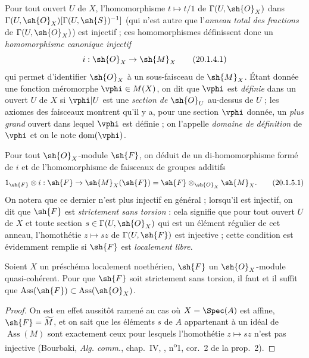 \begin{env}[20.1.4]
Pour tout ouvert $U$ de $X$, l'homomorphisme $t\mapsto t/1$ de $\Gamma(U,\sh{O}_X)$ dans $\Gamma(U,\sh{O}_X)[\Gamma(U,\sh{S})^{-1}]$ (qui n'est autre que l'\emph{anneau total des fractions} de
$\Gamma(U,\sh{O}_X)$) est injectif ; ces homomorphismes définissent donc un \emph{homomorphisme canonique injectif}
\[
\label{IV.20.1.4.1}
  i:\sh{O}_X\to\sh{M}_X
  \tag{20.1.4.1}
\]
qui permet d'identifier $\sh{O}_X$ à un sous-faisceau de $\sh{M}_X$.
Étant donnée une fonction méromorphe $\vphi\in M(X)$, on dit que $\vphi$ est \emph{définie} dans un ouvert $U$ de $X$ si $\vphi|U$ est une \emph{section de $\sh{O}_U$} au-dessus de $U$ ; les axiomes des faisceaux montrent qu'il y a, pour une section $\vphi$ donnée, un \emph{plus grand} ouvert dans lequel $\vphi$ est définie ; on l'appelle \emph{domaine de définition} de $\vphi$ et on le note $\operatorname{dom}(\vphi)$.
\end{env}

\begin{env}[20.1.5]
Pour tout $\sh{O}_X$-module $\sh{F}$, on déduit de  un di-homomorphisme formé de $i$ et de l'homomorphisme de faisceaux de groupes additifs
\[
\label{IV.20.1.5.1}
  1_{\sh{F}}\otimes i:\sh{F}\to\sh{M}_X(\sh{F})=\sh{F}\otimes_{\sh{O}_X}\sh{M}_X.
  \tag{20.1.5.1}
\]
On notera que ce dernier n'est plus injectif en général ; lorsqu'il est injectif, on dit que $\sh{F}$ est \emph{strictement sans torsion} : cela signifie que pour tout ouvert $U$ de $X$ et toute section $s\in\Gamma(U,\sh{O}_X)$ qui est un élément régulier de cet anneau, l'homothétie $z\mapsto sz$ de $\Gamma(U,\sh{F})$ est injective ; cette condition est évidemment remplie si $\sh{F}$ est \emph{localement libre}.
\end{env}

\begin{proposition}[20.1.6]
\label{IV.20.1.6}
Soient $X$ un préschéma localement noethérien, $\sh{F}$ un $\sh{O}_X$-module quasi-cohérent.
Pour que $\sh{F}$ soit strictement sans torsion, il faut et il suffit que $\operatorname{Ass}(\sh{F})\subset\operatorname{Ass}(\sh{O}_X)$.
\end{proposition}

\begin{proof}
On est en effet aussitôt ramené au cas où $X=\Spec(A)$ est affine, $\sh{F}=\widetilde M$, et on sait que les éléments $s$ de $A$ appartenant à un idéal de $\operatorname{Ass}(M)$ sont exactement ceux pour lesquels l'homothétie $z\mapsto sz$ n'est pas injective (Bourbaki, \emph{Alg. comm.}, chap.~IV, , n\textsuperscript{o}1, cor.~2 de la prop.~2).
\end{proof}

